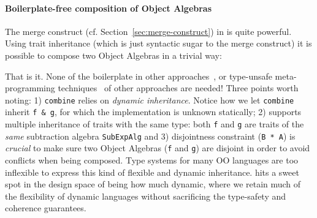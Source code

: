 

\paragraph{Boilerplate-free composition of Object Algebras} 
The merge construct (cf. Section~\ref{sec:merge-construct}) in \name is quite
powerful. Using trait inheritance (which is just syntactic sugar to the merge
construct) it is possible to compose two Object Algebras in a trivial way:



That is it. None of the boilerplate in other approaches~\cite{}, or type-unsafe
meta-programming techniques~\cite{} of other approaches are needed! Three points
worth noting: 1) \lstinline{combine} relies on \textit{dynamic inheritance}.
Notice how we let \lstinline{combine} inherit \lstinline{f & g}, for which the
implementation is unknown statically; 2) \name supports multiple inheritance of
traits with the same type: both \lstinline{f} and \lstinline{g} are traits of
the \emph{same} subtraction algebra \lstinline{SubExpAlg} and 3) disjointness
constraint (\lstinline{B * A}) is \textit{crucial} to make sure two Object
Algebras (\lstinline{f} and \lstinline{g}) are disjoint in order to avoid
conflicts when being composed. Type systems for many OO languages are too
inflexible to express this kind of flexible and dynamic inheritance. \name hits
a sweet spot in the design space of being how much dynamic, where we retain much
of the flexibility of dynamic languages without sacrificing the type-safety and
coherence guarantees.

